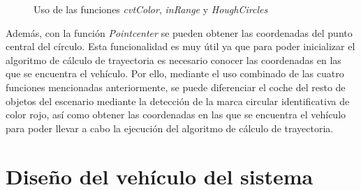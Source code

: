 \begin{figure}[htbp]
 \centering
 \caption{Uso de las funciones \emph{cvtColor}, \emph{inRange} y \emph{HoughCircles}}
 \label{fig:CirculosRojosDetectados}
\end{figure}

Además, con la función \emph{Pointcenter} se pueden obtener las coordenadas del punto central del círculo. Esta funcionalidad es muy útil ya que para poder inicializar el algoritmo de cálculo de trayectoria es necesario conocer las coordenadas en las que se encuentra el vehículo. Por ello, mediante el uso combinado de las cuatro funciones mencionadas anteriormente, se puede diferenciar el coche del resto de objetos del escenario mediante la detección de la marca circular identificativa de color rojo, así como obtener las coordenadas en las que se encuentra el vehículo para poder llevar a cabo la ejecución del algoritmo de cálculo de trayectoria.



\section{Diseño del vehículo del sistema}\label{sec:DiseñoVehiculo}

